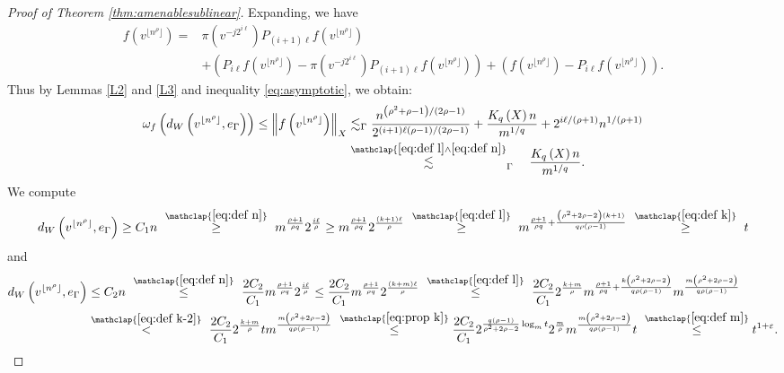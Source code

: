 \documentclass[11pt,reqno]{amsart}
\newcommand{\1}{\mathbf 1}
\begin{document}
\begin{proof}[Proof of Theorem \ref{thm:amenablesublinear}]
Expanding, we have
\begin{align*}
f\left(v^{\lfloor n^\rho\rfloor}\right)=&\pi\left(v^{-j2^{i\ell}}\right)P_{\left(i+1\right)\ell}f\left(v^{\lfloor n^\rho\rfloor}\right)\\
&+\left(P_{i\ell}f\left(v^{\lfloor n^\rho\rfloor}\right) -\pi\left(v^{-j2^{i\ell}}\right)P_{\left(i+1\right)\ell}f\left(v^{\lfloor n^\rho\rfloor}\right) \right) +\left(f\left(v^{\lfloor n^\rho\rfloor}\right)-P_{i\ell}f\left(v^{\lfloor n^\rho\rfloor}\right)\right).
\end{align*}
Thus by Lemmas \ref{L2} and \ref{L3} and inequality \eqref{eq:asymptotic}, we obtain:
\begin{align}\label{eq:before m}
\begin{aligned}
\omega_f\left(d_W\left(v^{\lfloor n^\rho\rfloor},e_\Gamma\right)\right)\le \left\|f\left(v^{\lfloor n^\rho\rfloor}\right)\right\|_X
&\lesssim_\Gamma \frac{n^{\left(\rho^2+\rho-1\right)/\left(2\rho-1\right)}}{2^{\left(i+1\right)\ell\left(\rho-1\right)/\left(2\rho-1\right)}}+\frac{K_q\left(X\right)n}{m^{1/q}}+2^{i\ell/\left(\rho+1\right)}n^{1/\left(\rho+1\right)}\\
&\stackrel{\mathclap{\eqref{eq:def l}\wedge \eqref{eq:def n}}}{\lesssim}_\Gamma\quad \frac{K_q\left(X\right)n}{m^{1/q}}.
\end{aligned}
\end{align}
We compute
\begin{equation*}\label{eq:lower m}
d_W\left(v^{\lfloor n^\rho\rfloor},e_\Gamma\right)\ge C_1n ~\stackrel{\mathclap{\eqref{eq:def n}}}{\ge}~ m^{\frac{\rho+1}{\rho q}}2^{\frac{i\ell}{\rho}}\ge m^{\frac{\rho+1}{\rho q}}2^{\frac{\left(k+1\right)\ell}{\rho}}
~\stackrel{\mathclap{\eqref{eq:def l}}}{\ge}~ m^{\frac{\rho+1}{\rho q}+\frac{\left(\rho^2+2\rho-2\right)\left(k+1\right)}{q\rho\left(\rho-1\right)}}~\stackrel{\mathclap{\eqref{eq:def k}}}{\ge}~ t
\end{equation*}
and
\begin{align*}
d_W\left(v^{\lfloor n^\rho\rfloor},e_\Gamma\right)&\le C_2 n~\stackrel{\mathclap{\eqref{eq:def n}}}{\le}~ \frac{2C_2}{C_1}m^{\frac{\rho+1}{\rho q}}2^{\frac{i\ell}{\rho}}\le \frac{2C_2}{C_1}m^{\frac{\rho+1}{\rho q}}2^{\frac{\left(k+m\right)\ell}{\rho}}
~\stackrel{\mathclap{\eqref{eq:def l}}}{\le}~ \frac{2C_2}{C_1}2^{\frac{k+m}{\rho}}m^{\frac{\rho+1}{\rho q}+\frac{k\left(\rho^2+2\rho-2\right)}{q\rho\left(\rho-1\right)}} m^{\frac{m\left(\rho^2+2\rho-2\right)}{q\rho\left(\rho-1\right)}}\\
&\stackrel{\mathclap{\eqref{eq:def k-2}}}{<}~\frac{2C_2}{C_1}2^{\frac{k+m}{\rho}}tm^{\frac{m\left(\rho^2+2\rho-2\right)}{q\rho\left(\rho-1\right)}}~\stackrel{\mathclap{\eqref{eq:prop k}}}{\le}\frac{2C_2}{C_1}2^{\frac{q\left(\rho-1\right)}{\rho^2+2\rho-2}\log_m t}2^{\frac{m}{\rho}}m^{\frac{m\left(\rho^2+2\rho-2\right)}{q\rho\left(\rho-1\right)}}t~\stackrel{\mathclap{\eqref{eq:def m}}}{\le} t^{1+\varepsilon}.

\end{align*}
\end{proof}
\end{document}

